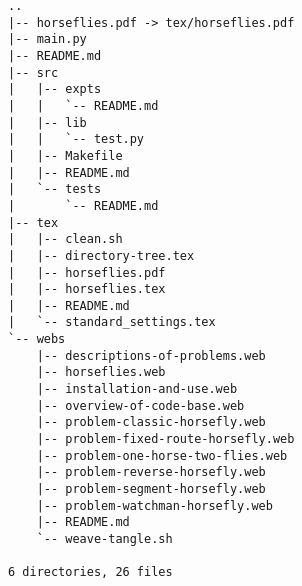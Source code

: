 \begin{verbatim}
..
|-- horseflies.pdf -> tex/horseflies.pdf
|-- main.py
|-- README.md
|-- src
|   |-- expts
|   |   `-- README.md
|   |-- lib
|   |   `-- test.py
|   |-- Makefile
|   |-- README.md
|   `-- tests
|       `-- README.md
|-- tex
|   |-- clean.sh
|   |-- directory-tree.tex
|   |-- horseflies.pdf
|   |-- horseflies.tex
|   |-- README.md
|   `-- standard_settings.tex
`-- webs
    |-- descriptions-of-problems.web
    |-- horseflies.web
    |-- installation-and-use.web
    |-- overview-of-code-base.web
    |-- problem-classic-horsefly.web
    |-- problem-fixed-route-horsefly.web
    |-- problem-one-horse-two-flies.web
    |-- problem-reverse-horsefly.web
    |-- problem-segment-horsefly.web
    |-- problem-watchman-horsefly.web
    |-- README.md
    `-- weave-tangle.sh

6 directories, 26 files
\end{verbatim}
